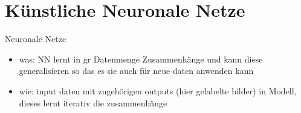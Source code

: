 \section[\thesection \  Künstliche Neuronale Netze]{Künstliche Neuronale Netze}\label{sec:nn}

\begin{frame}{Neuronale Netze}

    \begin{itemize}
        \item was: NN lernt in gr Datenmenge Zusammenhänge und kann diese generalisieren so das es sie auch für neue daten anwenden kann
        \item wie: input daten mit zugehörigen outputs (hier gelabelte bilder) in Modell, dieses lernt iterativ die zusammenhänge
    \end{itemize}

    \vspace{1cm}

    \begin{center}
        \begin{columns}[T]
            
            
        \end{columns}
        
    \end{center}
    
\end{frame}

